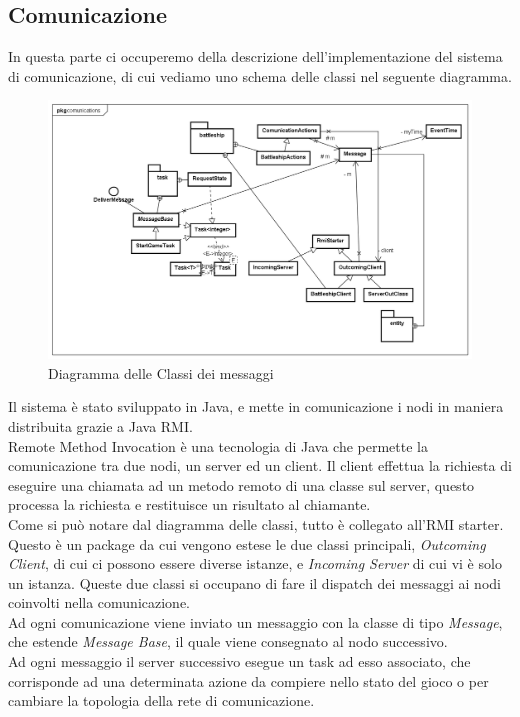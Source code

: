 \documentclass{llncs}
\begin{document}
\subsection{Comunicazione}
In questa parte ci occuperemo della descrizione dell'implementazione del sistema di comunicazione, di cui vediamo uno schema delle classi nel seguente diagramma.\\
\begin{figure}[H]
\centering
    \includegraphics[width=12cm]{imgs/diagramma-delle-comunicazioni.png}
     \caption{Diagramma delle Classi dei messaggi}
   \label{output:blacknoxis_normal}
\end{figure}
Il sistema è stato sviluppato in Java, e mette in comunicazione i nodi in maniera distribuita grazie a Java RMI.\\
Remote Method Invocation è una tecnologia di Java che permette la comunicazione tra due nodi, un server ed un client. Il client effettua la richiesta di eseguire una chiamata ad un metodo remoto di una classe sul server, questo processa la richiesta e restituisce un risultato al chiamante.\\
Come si può notare dal diagramma delle classi, tutto è collegato all'RMI starter. Questo è un package da cui vengono estese le due classi principali, \emph{Outcoming Client}, di cui ci possono essere diverse istanze, e \emph{Incoming Server} di cui vi è solo un istanza. Queste due classi si occupano di fare il dispatch dei messaggi ai nodi coinvolti nella comunicazione. \\
Ad ogni comunicazione viene inviato un messaggio con la classe di tipo \emph{Message}, che estende \emph{Message Base}, il quale viene consegnato al nodo successivo.\\
Ad ogni messaggio il server successivo esegue un task ad esso associato, che corrisponde ad una determinata azione da compiere nello stato del gioco o per cambiare la topologia della rete di comunicazione.\\
\end{document}
